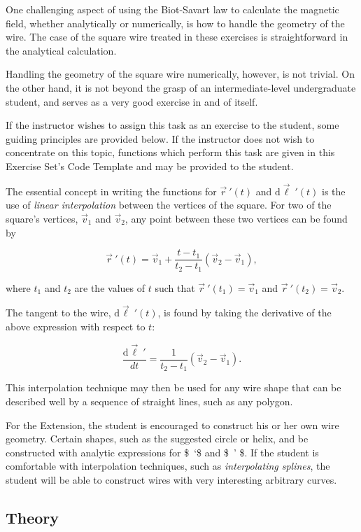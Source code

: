 \documentclass[]{article}
\begin{document}
One challenging aspect of using the Biot-Savart law to calculate the
magnetic field, whether analytically or numerically, is how to handle
the geometry of the wire. The case of the square wire treated in these
exercises is straightforward in the analytical calculation.

Handling the geometry of the square wire numerically, however, is not
trivial. On the other hand, it is not beyond the grasp of an
intermediate-level undergraduate student, and serves as a very good
exercise in and of itself.

If the instructor wishes to assign this task as an exercise to the
student, some guiding principles are provided below. If the instructor
does not wish to concentrate on this topic, functions which perform this
task are given in this Exercise Set's Code Template and may be provided
to the student.

The essential concept in writing the functions for \(\vec{r}\ ' (t)\)
and \(\mathrm{d}\vec{\ell}\ ' (t)\) is the use of \emph{linear
interpolation} between the vertices of the square. For two of the
square's vertices, \(\vec{v}_1\) and \(\vec{v}_2\), any point between
these two vertices can be found by

\[ \vec{r}\ ' (t) = \vec{v}_1 + \frac{t-t_1}{t_2 - t_1}\left( \vec{v}_2 - \vec{v}_1 \right), \]

where \(t_1\) and \(t_2\) are the values of \(t\) such that
\(\vec{r}\ ' (t_1) = \vec{v}_1\) and \(\vec{r}\ ' (t_2) = \vec{v}_2\).

The tangent to the wire, \(\mathrm{d}\vec{\ell}\ ' (t)\), is found by
taking the derivative of the above expression with respect to \(t\):

\[ \frac{\mathrm{d}\vec{\ell}\ ' }{dt} = \frac{1}{t_2 - t_1}\left( \vec{v}_2 - \vec{v}_1 \right) .\]

This interpolation technique may then be used for any wire shape that
can be described well by a sequence of straight lines, such as any
polygon.

For the Extension, the student is encouraged to construct his or her own
wire geometry. Certain shapes, such as the suggested circle or helix,
and be constructed with analytic expressions for \$~`\$ and
\$\vec{\ell}~' \$. If the student is comfortable with
interpolation techniques, such as \emph{interpolating splines}, the
student will be able to construct wires with very interesting arbitrary
curves.

\subsection{Theory}\label{theory}
\end{document}

